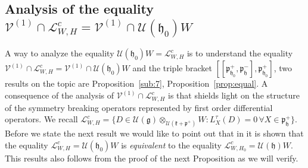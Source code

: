 \documentclass[12pt]{amsart}
\theoremstyle{definition}
\theoremstyle{remark}
\newcommand{\g}{\mathfrak{g}}
\newcommand{\h}{\mathfrak{h}}
\renewcommand{\k}{{\mathfrak k}}
\newcommand{\p}{\mathfrak p}
\numberwithin{equation}{section}
\begin{document}
 \subsection{Analysis of the equality $  \mathcal V^{(1)}\cap \mathcal L_{W,H}^c =  \mathcal V^{(1)}\cap \mathcal U(\h_0)W  $ } \smallskip
 A way to analyze the equality $\mathcal U(\h_0)W=\mathcal L_{W,H}^c$ is to understand the equality  $  \mathcal V^{(1)}\cap \mathcal L_{W,H}^c = \mathcal V^{(1)}\cap \mathcal U(\h_0)W  $ and the triple bracket  $[[\p_{\h_0}^+, \p_{\h}^-],\p_{\h_0}^+]$, two results on the topic are Proposition~\ref{sub:7}, Proposition~\ref{prop:equal}. A consequence of the analysis of $  \mathcal V^{(1)}\cap \mathcal L_{W,H}^c $ is that shields light on the structure of the symmetry breaking operators represented by  first order differential operators.
   We recall $\mathcal L_{W,H}^c=\{ D \in \mathcal U(\g) \otimes_{\mathcal U(\k+\p^+)} W : L_X^\tau(D)=0 \, \forall X \in \p_\h^+\}$.  Before we state the next result we would like to point out that in \cite[Lemma 3]{Va} it is shown that the equality $\mathcal L_{W,H}^c  =   \mathcal U(\h_0)W  $ is {\em equivalent} to the equality $\mathcal L_{W,H_0}^c  =   \mathcal U(\h)W  $. This results also follows from the proof of the next Proposition as we will verify.
\end{document}
